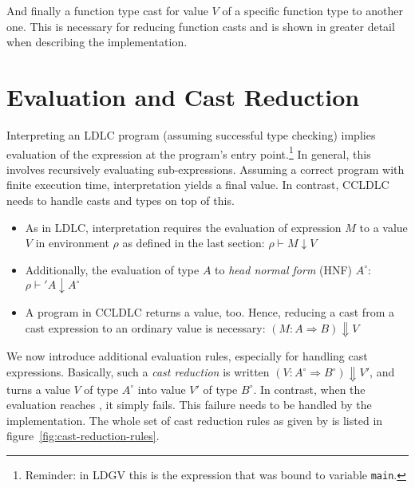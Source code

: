 And finally a function type cast for value $V$ of a specific function type to another one. This is necessary for reducing function casts and is shown in greater detail when describing the implementation.

\section{Evaluation and Cast Reduction}\label{sec:ccldlc-inference-rules}

Interpreting an LDLC program (assuming successful type checking) implies evaluation of the expression at the program's entry point.\footnote{Reminder: in LDGV this is the expression that was bound to variable \texttt{main}.} In general, this involves recursively evaluating sub-expressions. Assuming a correct program with finite execution time, interpretation yields a final value. In contrast, CCLDLC needs to handle casts and types on top of this.

\begin{itemize}
\item As in LDLC, interpretation requires the evaluation of expression $M$ to a value $V$ in environment $\rho$ as defined in the last section:
	$\rho \vdash M \downarrow V$
\item Additionally, the evaluation of type $A$ to \emph{head normal form} (HNF) $A^\circ$:
	$\rho \vdash' A \downarrow A^\circ$
\item A program in CCLDLC returns a value, too. Hence, reducing a cast from a cast expression to an ordinary value is necessary: $(M : A \Rightarrow B) \Downarrow V$
\end{itemize}

We now introduce additional evaluation rules, especially for handling cast expressions. Basically, such a \emph{cast reduction} is written $(V : A^\circ \Rightarrow B^\circ) \Downarrow V'$, and turns a value $V$ of type $A^\circ$ into value $V'$ of type $B^\circ$. In contrast, when the evaluation reaches \blame, it simply fails. This failure needs to be handled by the implementation. The whole set of cast reduction rules as given by \cite{fu2021} is listed in figure~\ref{fig:cast-reduction-rules}.


